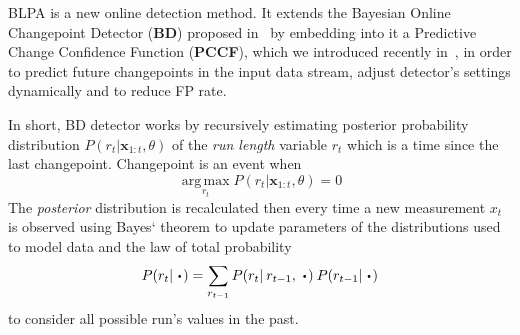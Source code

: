 BLPA is a new online detection method. It extends the Bayesian Online Changepoint Detector (\textbf{BD}) proposed in~\cite{mackay2007} by embedding into it a Predictive Change Confidence Function (\textbf{PCCF}), which we introduced recently in~\cite{MaslovSDM2016}, in order to predict future changepoints in the input data stream, adjust detector's settings dynamically and to reduce FP rate.

In short, BD detector works by recursively estimating posterior probability distribution $P(r_t | \pmb{x}_{1:t}, \theta)$ of the \textit{run length}  variable $r_t$ which is a time since the last changepoint.
Changepoint is an event when
\[
    \operatorname*{arg\,max}_{r_t} P(r_t | \pmb{x}_{1:t}, \theta) = 0
\]
The \textit{posterior} distribution is recalculated then every time a new measurement $x_t$ is observed using Bayes` theorem to update parameters of the distributions used to model data
and the law of total probability
\[
P(r_t|\:\LargeCdot) = \sum_{r_{t-1}} P(r_{t} | \: r_{t-1},\:\LargeCdot) \: P(r_{t-1}|\:\LargeCdot)
\]
to consider all possible run's values in the past.
%

